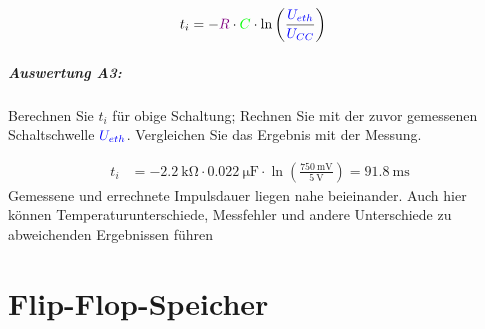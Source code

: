 \documentclass[a4paper,titlepage,parskip]{scrreprt}
\newcommand{\spannung}[1]{\textcolor{blue}{#1}}
\newcommand{\widerstand}[1]{\textcolor{violet}{#1}}
\newcommand{\capacity}[1]{\textcolor{green}{#1}}
\begin{document}
          \begin{align*}
              t_i &= -\widerstand{R} \cdot \capacity{C} \cdot  \ln\left(\frac{\spannung{U_{eth}}}{\spannung{U_{CC}}}\right)
          \end{align*}

        \paragraph{Auswertung A3:} Berechnen Sie $t_i$ für obige Schaltung; Rechnen Sie mit der zuvor gemessenen
          Schaltschwelle $\spannung{U_{eth}}$. Vergleichen Sie das Ergebnis mit der Messung.

          \begin{align*}
          t_i &= -\SI{2,2}{\kilo\ohm} \cdot \SI{0,022}{\micro\farad} \cdot  \ln\left(\frac{\SI{750}{\milli\volt}}{\SI{5}{\volt}}\right) = \SI{91,8}{\milli\second}
          \end{align*}
           Gemessene und errechnete Impulsdauer liegen nahe beieinander. Auch hier können Temperaturunterschiede, Messfehler und andere Unterschiede zu abweichenden Ergebnissen führen
  \chapter{Flip-Flop-Speicher}
\end{document}
